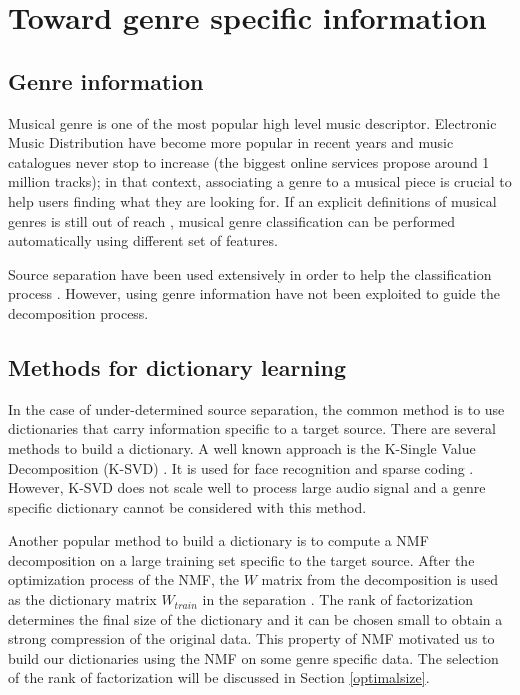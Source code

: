 \documentclass{article}
\begin{document}
\section{Toward genre specific information}\label{defgenre}

\subsection{Genre information}

Musical genre is one of the most popular high level music descriptor. Electronic Music Distribution have become more popular in recent years and music catalogues never stop to increase (the biggest online services propose around 1 million tracks); in that context, associating a genre to a musical piece is crucial to help users finding what they are looking for. If an explicit definitions of musical genres is still out of reach \cite{aucouturier2003representing}, musical genre classification can be performed automatically using different set of features\cite{tzanetakis2002musical,mckay2006musical}. 

Source separation have been used extensively in order to help the classification process \cite{rump2010autoregressive,lampropoulos2005musical}. However, using genre information have not been exploited to guide the decomposition process. 


\subsection{Methods for dictionary learning}

In the case of under-determined source separation, the common method is to use dictionaries that carry information specific to a target source. There are several methods to build a dictionary. A well known approach is the K-Single Value Decomposition (K-SVD) \cite{aharon2006img}. It is used for face recognition \cite{zhang2010discriminative} and sparse coding \cite{jiang2011learning}. However, K-SVD does not scale well to process large audio signal and a genre specific dictionary cannot be considered with this method.

Another popular method to build a dictionary is to compute a NMF decomposition on a large training set specific to the target source. After the optimization process of the NMF, the $W$ matrix from the decomposition is used as the dictionary matrix $W_{train}$ in the separation \cite{jaureguiberry2011adaptation}. The rank of factorization determines the final size of the dictionary and it can be chosen small to obtain a strong compression of the original data. This property of NMF motivated us to build our dictionaries using the NMF on some genre specific data. The selection of the rank of factorization will be discussed in Section \ref{optimalsize}.  
\end{document}
